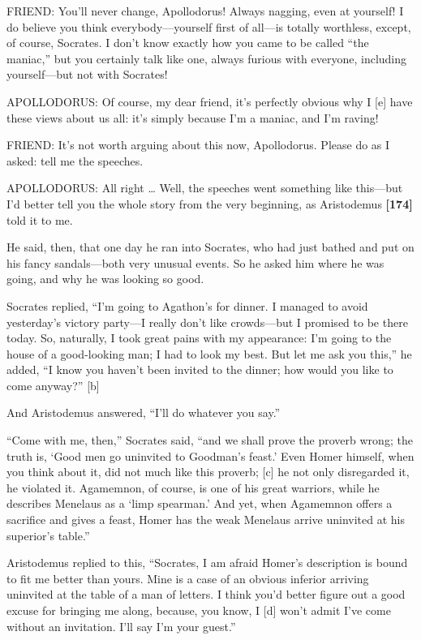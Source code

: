 FRIEND: You'll never change, Apollodorus! Always nagging, even at
yourself! I do believe you think everybody---yourself first of all---is
totally worthless, except, of course, Socrates. I don't know exactly how
you came to be called “the maniac,” but you certainly talk like one,
always furious with everyone, including yourself---but not with
Socrates!

APOLLODORUS: Of course, my dear friend, it's perfectly obvious why I
{[}e{]} have these views about us all: it's simply because I'm a maniac,
and I'm raving!

FRIEND: It's not worth arguing about this now, Apollodorus. Please do as
I asked: tell me the speeches.

APOLLODORUS: All right \ldots{} Well, the speeches went something like
this---but I'd better tell you the whole story from the very beginning,
as Aristodemus {\bf {[}174{]}} told it to me.

He said, then, that one day he ran into Socrates, who had just bathed
and put on his fancy sandals---both very unusual events. So he asked him
where he was going, and why he was looking so good.

Socrates replied, “I'm going to Agathon's for dinner. I managed to avoid
yesterday's victory party---I really don't like crowds---but I promised
to be there today. So, naturally, I took great pains with my appearance:
I'm going to the house of a good-looking man; I had to look my best. But
let me ask you this,” he added, “I know you haven't been invited to the
dinner; how would you like to come anyway?” {[}b{]}

And Aristodemus answered, “I'll do whatever you say.”

“Come with me, then,” Socrates said, “and we shall prove the proverb
wrong; the truth is, ‘Good men go uninvited to Goodman's
feast.' Even Homer
himself, when you think about it, did not much like this proverb;
{[}c{]} he not only disregarded it, he violated it. Agamemnon, of
course, is one of his great warriors, while he describes Menelaus as a
‘limp spearman.' And yet, when Agamemnon offers a sacrifice and gives a
feast, Homer has the weak Menelaus arrive uninvited at his superior's
table.”

Aristodemus replied to this, “Socrates, I am afraid Homer's description
is bound to fit me better than yours. Mine is a case of an obvious
inferior arriving uninvited at the table of a man of letters. I think
you'd better figure out a good excuse for bringing me along, because,
you know, I {[}d{]} won't admit I've come without an invitation. I'll
say I'm your guest.”


